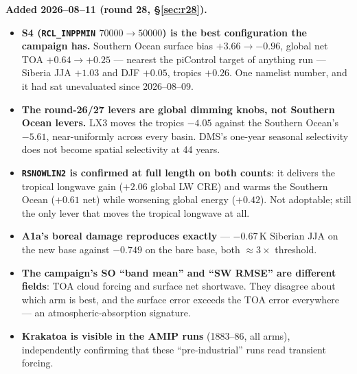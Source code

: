 \documentclass[10pt]{article}
\begin{document}
\textbf{Added 2026--08--11 (round 28, \S\ref{sec:r28}).}
\begin{itemize}\itemsep2pt
\item \textbf{S4 (\texttt{RCL\_INPPMIN} $70000\to50000$) is the best configuration the
campaign has.} Southern Ocean surface bias $+3.66\to-0.96$, global net TOA $+0.64\to
\mathbf{+0.25}$ --- nearest the piControl target of anything run --- Siberia JJA $+1.03$
and DJF $+0.05$, tropics $+0.26$. One namelist number, and it had sat unevaluated since
2026--08--09.
\item \textbf{The round-26/27 levers are global dimming knobs, not Southern Ocean
levers.} LX3 moves the tropics $-4.05$ against the Southern Ocean's $-5.61$, near-uniformly
across every basin. DMS's one-year seasonal selectivity does not become spatial
selectivity at 44 years.
\item \textbf{\texttt{RSNOWLIN2} is confirmed at full length on both counts}: it
delivers the tropical longwave gain ($+2.06$ global LW CRE) and warms the Southern Ocean
($+0.61$ net) while worsening global energy ($+0.42$). Not adoptable; still the only lever
that moves the tropical longwave at all.
\item \textbf{A1a's boreal damage reproduces exactly} --- $-0.67$\,K Siberian JJA on the
new base against $-0.749$ on the bare base, both ${\approx}3\times$ threshold.
\item \textbf{The campaign's SO ``band mean'' and ``SW RMSE'' are different fields}: TOA
cloud forcing and surface net shortwave. They disagree about which arm is best, and the
surface error exceeds the TOA error everywhere --- an atmospheric-absorption signature.
\item \textbf{Krakatoa is visible in the AMIP runs} (1883--86, all arms), independently
confirming that these ``pre-industrial'' runs read transient forcing.
\end{itemize}
\end{document}

